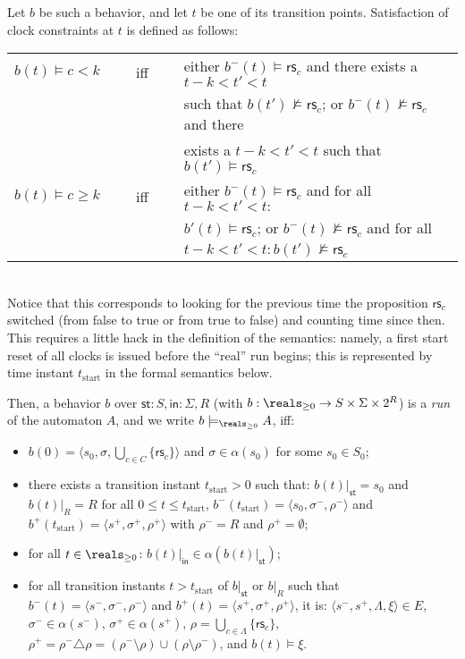 \documentclass[a4paper]{article}
\newcommand{\tstart}{t_{\mathrm{start}}}
\newcommand{\st}{\mathsf{st}}
\newcommand{\inpt}{\mathsf{in}}
\newcommand{\rest}[1]{\mathsf{rs}_{#1}}
\theoremstyle{plain}
\theoremstyle{definition}
\begin{document}
Let $b$ be such a behavior, and let $t$ be one of its transition points.
Satisfaction of clock constraints at $t$ is defined as follows: \\
\begin{tabular}{l c l}
  $b(t) \models c < k$  & \ \ \ iff\ \ \ &  either $b^-(t) \models \rest{c}$ and there exists a $t-k < t' < t$ \\
                                       && such that $b(t') \not\models \rest{c}$; or $b^-(t) \not\models \rest{c}$ and there \\ 
                                       && exists a $t-k < t' < t$ such that $b(t') \models \rest{c}$ \\
  $b(t) \models c \geq k$  & \ \ \ iff\ \ \ &  either $b^-(t) \models \rest{c}$ and for all $t-k < t' < t:$ \\
                                       && $b'(t) \models \rest{c}$; or $b^-(t) \not\models \rest{c}$ and for all \\
                                       && $t-k < t' < t: b(t') \not\models \rest{c}$
\end{tabular} \\
Notice that this corresponds to looking for the previous time the proposition $\rest{c}$ switched (from false to true or from true to false) and counting time since then.
This requires a little hack in the definition of the semantics: namely, a first start reset of all clocks is issued before the ``real'' run begins; this is represented by time instant $\tstart$ in the formal semantics below.

Then, a behavior $b$ over $\st:S, \inpt:\Sigma, R$ (with $b: \reals_{\geq 0} \rightarrow S \times \Sigma \times 2^R$) is a \emph{run} of the automaton $A$, and we write $b \models_{\reals_{\geq 0}} A$, iff:
\begin{itemize}
\item $b(0) = \langle s_0, \sigma, \bigcup_{c \in C} \{\rest{c}\} \rangle$ and $\sigma \in \alpha(s_0)$ for some $s_0 \in S_0$;
\item there exists a transition instant $\tstart > 0$ such that: $b(t)|_{\st} = s_0$ and $b(t)|_R = R$ for all $0 \leq t \leq \tstart$, $b^-(\tstart) = \langle s_0, \sigma^-, \rho^- \rangle$ and $b^+(\tstart) = \langle s^+, \sigma^+, \rho^+ \rangle$ with $\rho^- = R$ and $\rho^+ = \emptyset$;
\item for all $t \in \reals_{\geq 0}$: $b(t)|_{\inpt} \in \alpha(b(t)|_{\st})$;
\item for all transition instants $t > \tstart$ of $b|_{\st}$ or $b|_{R}$ such that $b^-(t) = \langle s^-, \sigma^-, \rho^- \rangle$ and $b^+(t) = \langle s^+, \sigma^+, \rho^+ \rangle$, it is: $\langle s^-, s^+, \Lambda, \xi \rangle \in E$, $\sigma^- \in \alpha(s^-)$, $\sigma^+ \in \alpha(s^+)$, $\rho = \bigcup_{c \in \Lambda}\{\rest{c}\}$, $\rho^+ = \rho^- \triangle \rho = (\rho^- \setminus \rho) \cup (\rho \setminus \rho^-)$, and $b(t) \models \xi$.
\end{itemize}
\end{document}
